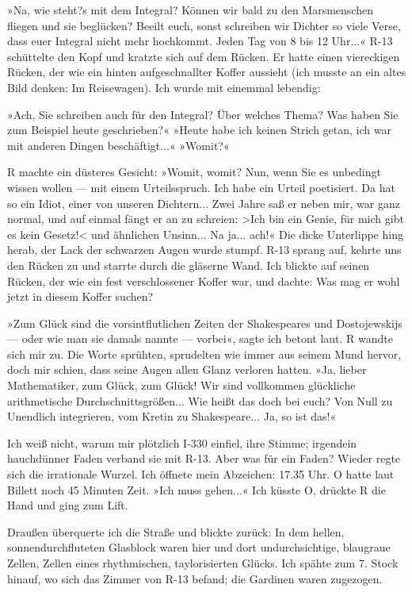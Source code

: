 »Na, wie steht?s mit dem Integral? Können wir bald zu den
Marsmenschen fliegen und sie beglücken? Beeilt euch, sonst
schreiben wir Dichter so viele Verse, dass euer Integral nicht mehr
hochkommt. Jeden Tag von 8 bis 12 Uhr...« R-13 schüttelte den Kopf
und kratzte sich auf dem Rücken. Er hatte einen viereckigen Rücken,
der wie ein hinten aufgeschnallter Koffer aussieht (ich musste an
ein altes Bild denken: Im Reisewagen). Ich wurde mit einemmal
lebendig:

»Ach, Sie schreiben auch für den Integral? Über welches Thema? Was
haben Sie zum Beispiel heute geschrieben?« »Heute habe ich keinen
Strich getan, ich war mit anderen Dingen beschäftigt...« »Womit?«

R machte ein düsteres Gesicht: »Womit, womit? Nun, wenn Sie es
unbedingt wissen wollen — mit einem Urteilsspruch. Ich habe ein
Urteil poetisiert. Da hat so ein Idiot, einer von unseren
Dichtern... Zwei Jahre saß er neben mir, war ganz normal, und auf
einmal fängt er an zu schreien: \textgreater{}Ich bin ein Genie,
für mich gibt es kein Gesetz!\textless{} und ähnlichen Unsinn... Na
ja... ach!« Die dicke Unterlippe hing herab, der Lack der schwarzen
Augen wurde stumpf. R-13 sprang auf, kehrte uns den Rücken zu und
starrte durch die gläserne Wand. Ich blickte auf seinen Rücken, der
wie ein fest verschlossener Koffer war, und dachte: Was mag er wohl
jetzt in diesem Koffer suchen?

»Zum Glück sind die vorsintflutlichen Zeiten der Shakespeares und
Dostojewskijs — oder wie man sie damals nannte — vorbei«, sagte ich
betont laut. R wandte sich mir zu. Die Worte sprühten, sprudelten
wie immer aus seinem Mund hervor, doch mir schien, dass seine Augen
allen Glanz verloren hatten. »Ja, lieber Mathematiker, zum Glück,
zum Glück! Wir sind vollkommen glückliche arithmetische
Durchschnittsgrößen... Wie heißt das doch bei euch? Von Null zu
Unendlich integrieren, vom Kretin zu Shakespeare... Ja, so ist
das!«

Ich weiß nicht, warum mir plötzlich I-330 einfiel, ihre Stimme;
irgendein hauchdünner Faden verband sie mit R-13. Aber was für ein
Faden? Wieder regte sich die irrationale Wurzel. Ich öffnete mein
Abzeichen: 17.35 Uhr. O hatte laut Billett noch 45 Minuten Zeit.
»Ich muss gehen...« Ich küsste O, drückte R die Hand und ging zum
Lift.

Draußen überquerte ich die Straße und blickte zurück: In dem
hellen, sonnendurchfluteten Glasblock waren hier und dort
undurchsichtige, blaugraue Zellen, Zellen eines rhythmischen,
taylorisierten Glücks. Ich spähte zum 7. Stock hinauf, wo sich das
Zimmer von R-13 befand; die Gardinen waren zugezogen.

